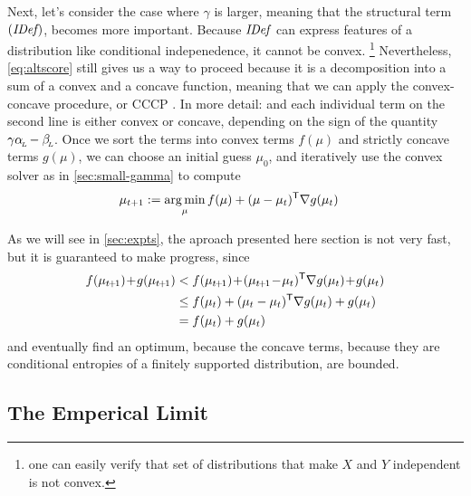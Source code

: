 \documentclass[twoside]{article}
\begin{document}
Next, let's consider the case where $\gamma$ is 
larger, meaning that the structural term $(\mathit{IDef}_{\!})$, 
becomes more important.
Because $\mathit{IDef}_{\!}$ can express features of a distribution like conditional indepenedence,
it cannot be convex.%
    \footnote{one can easily verify that set of distributions that make $X$ and $Y$ independent is not convex.}
Nevertheless, \eqref{eq:altscore} still gives us a way to proceed because it is a decomposition into a sum of a convex and a concave function, meaning that we can apply the convex-concave procedure, or CCCP \parencite{yuille2003concave}. 
In more detail: and each individual term on the second line is either convex or concave, depending on the sign of the quantity $\gamma \alpha_{\!_{L}\!} - \beta_{\!_{L}\!}$. 
Once we sort the terms into convex terms $f(\mu)$ and strictly concave terms $g(\mu)$, we can choose an initial guess $\mu_0$, and iteratively use the convex solver as in \cref{sec:small-gamma} to compute
%
\begin{align*}
    \mu_{t+1} &:= \operatorname*{arg\,min}_{\mu} f(\mu) + (\mu - \mu_{t})^{\sf T}
        \nabla g(\mu_t)
\end{align*}

As we will see in \cref{sec:expts}, the aproach presented here section is 
not very fast, but it is guaranteed to make progress, since
\def\tplus1{{t\mskip-2mu+\mskip-2mu1}}
\begin{align*}
    f(\mu_\tplus1) \!+\! g(\mu_\tplus1) &<  f(\mu_\tplus1) \!+\! (\mu_\tplus1 \!-\! \mu_t)^{\sf T} \nabla g(\mu_t) \!+\! g(\mu_t)
        \\
    &\le  f(\mu_t) + (\mu_t - \mu_{t})^{\sf T}\nabla g(\mu_t)  + g(\mu_t)
    \\
&= f(\mu_t) + g(\mu_t)
\end{align*}
and eventually find an optimum, because the concave terms, because they are conditional entropies of a finitely supported distribution, are bounded.


\subsection{The Emperical Limit}
    \label{sec:empirical-limit}
    
\end{document}
